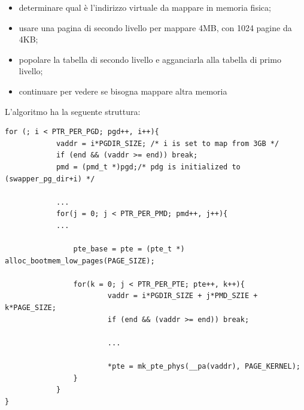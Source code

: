 \documentclass[12pt, oneside]{extbook}
\begin{document}
\begin{itemize}
\item determinare qual è l'indirizzo virtuale da mappare in memoria fisica;
\item usare una pagina di secondo livello per mappare 4MB, con 1024 pagine da 4KB;
\item popolare la tabella di secondo livello e agganciarla alla tabella di primo livello;
\item continuare per vedere se bisogna mappare altra memoria
\end{itemize}
L'algoritmo ha la seguente struttura:
\begin{lstlisting}
for (; i < PTR_PER_PGD; pgd++, i++){
			vaddr = i*PGDIR_SIZE; /* i is set to map from 3GB */
			if (end && (vaddr >= end)) break;
			pmd = (pmd_t *)pgd;/* pdg is initialized to (swapper_pg_dir+i) */
			
			...
			for(j = 0; j < PTR_PER_PMD; pmd++, j++){
			...
		
				pte_base = pte = (pte_t *) alloc_bootmem_low_pages(PAGE_SIZE);
				
				for(k = 0; j < PTR_PER_PTE; pte++, k++){
						vaddr = i*PGDIR_SIZE + j*PMD_SZIE + k*PAGE_SIZE;
						if (end && (vaddr >= end)) break;
						
						...
						
						*pte = mk_pte_phys(__pa(vaddr), PAGE_KERNEL);
				}
			}
}
\end{lstlisting}
\end{document}
